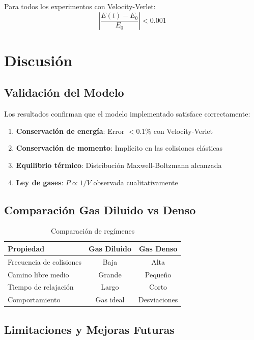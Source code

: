 \documentclass[12pt,a4paper]{article}
\begin{document}
Para todos los experimentos con Velocity-Verlet:
\begin{equation}
\left|\frac{E(t) - E_0}{E_0}\right| < 0.001
\end{equation}

\section{Discusión}

\subsection{Validación del Modelo}

Los resultados confirman que el modelo implementado satisface correctamente:
\begin{enumerate}
    \item \textbf{Conservación de energía}: Error $<0.1$\% con Velocity-Verlet
    \item \textbf{Conservación de momento}: Implícito en las colisiones elásticas
    \item \textbf{Equilibrio térmico}: Distribución Maxwell-Boltzmann alcanzada
    \item \textbf{Ley de gases}: $P \propto 1/V$ observada cualitativamente
\end{enumerate}

\subsection{Comparación Gas Diluido vs Denso}

\begin{table}[H]
\centering
\caption{Comparación de regímenes}
\begin{tabular}{|l|c|c|}
\hline
\textbf{Propiedad} & \textbf{Gas Diluido} & \textbf{Gas Denso} \\
\hline
Frecuencia de colisiones & Baja & Alta \\
Camino libre medio & Grande & Pequeño \\
Tiempo de relajación & Largo & Corto \\
Comportamiento & Gas ideal & Desviaciones \\
\hline
\end{tabular}
\end{table}

\subsection{Limitaciones y Mejoras Futuras}
\end{document}

